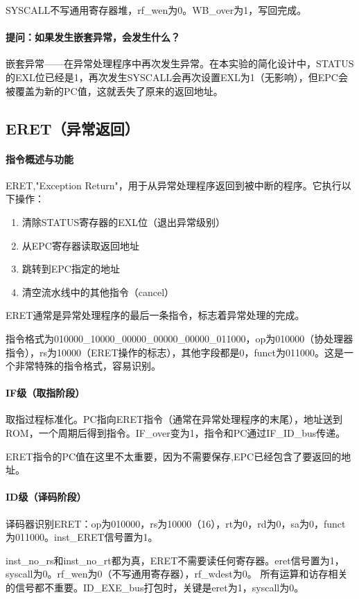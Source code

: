 \documentclass[a4paper]{article}
\begin{document}
	SYSCALL不写通用寄存器堆，rf\_wen为0。WB\_over为1，写回完成。
	\paragraph{提问：如果发生嵌套异常，会发生什么？}
	嵌套异常——在异常处理程序中再次发生异常。在本实验的简化设计中，STATUS的EXL位已经是1，再次发生SYSCALL会再次设置EXL为1（无影响），但EPC会被覆盖为新的PC值，这就丢失了原来的返回地址。
	
	\subsection{ERET（异常返回）}
	\paragraph{指令概述与功能}
	ERET,"Exception Return"，用于从异常处理程序返回到被中断的程序。它执行以下操作：
	
	\begin{enumerate}
		\item 清除STATUS寄存器的EXL位（退出异常级别）
		\item 从EPC寄存器读取返回地址
		\item 跳转到EPC指定的地址
		\item 清空流水线中的其他指令（cancel）
	\end{enumerate}
	
	ERET通常是异常处理程序的最后一条指令，标志着异常处理的完成。
	
	指令格式为010000\_10000\_00000\_00000\_00000\_011000，op为010000（协处理器指令），rs为10000（ERET操作的标志），其他字段都是0，funct为011000。这是一个非常特殊的指令格式，容易识别。
	\paragraph{IF级（取指阶段）}
	取指过程标准化。PC指向ERET指令（通常在异常处理程序的末尾），地址送到ROM，一个周期后得到指令。IF\_over变为1，指令和PC通过IF\_ID\_bus传递。
	
	ERET指令的PC值在这里不太重要，因为不需要保存,EPC已经包含了要返回的地址。
	\paragraph{ID级（译码阶段）}
	译码器识别ERET：op为010000，rs为10000（16），rt为0，rd为0，sa为0，funct为011000。inst\_ERET信号置为1。
	
	inst\_no\_rs和inst\_no\_rt都为真，ERET不需要读任何寄存器。eret信号置为1，syscall为0。rf\_wen为0（不写通用寄存器），rf\_wdest为0。
	所有运算和访存相关的信号都不重要。ID\_EXE\_bus打包时，关键是eret为1，syscall为0。
\end{document}
